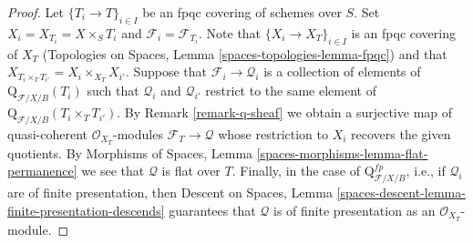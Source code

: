 \documentclass{stacks-project}
\theoremstyle{plain}
\theoremstyle{definition}
\theoremstyle{remark}
\numberwithin{equation}{subsection}
\begin{document}
\begin{proof}
Let $\{T_i \to T\}_{i \in I}$ be an fpqc covering of schemes over $S$.
Set $X_i = X_{T_i} = X \times_S T_i$ and $\mathcal{F}_i = \mathcal{F}_{T_i}$.
Note that $\{X_i \to X_T\}_{i \in I}$ is an fpqc covering of
$X_T$ (Topologies on Spaces, Lemma \ref{spaces-topologies-lemma-fpqc})
and that $X_{T_i \times_T T_{i'}} = X_i \times_{X_T} X_{i'}$.
Suppose that $\mathcal{F}_i \to \mathcal{Q}_i$ is a collection of
elements of $\text{Q}_{\mathcal{F}/X/B}(T_i)$ such that $\mathcal{Q}_i$
and $\mathcal{Q}_{i'}$ restrict to the same element of
$\text{Q}_{\mathcal{F}/X/B}(T_i \times_T T_{i'})$. By
Remark \ref{remark-q-sheaf}
we obtain a surjective map of quasi-coherent $\mathcal{O}_{X_T}$-modules
$\mathcal{F}_T \to \mathcal{Q}$ whose restriction to $X_i$ recovers
the given quotients.
By Morphisms of Spaces, Lemma \ref{spaces-morphisms-lemma-flat-permanence}
we see that $\mathcal{Q}$ is flat over $T$. Finally, in the case of
$\text{Q}^{fp}_{\mathcal{F}/X/B}$, i.e., if $\mathcal{Q}_i$ are
of finite presentation, then
Descent on Spaces, Lemma
\ref{spaces-descent-lemma-finite-presentation-descends}
guarantees that $\mathcal{Q}$ is of finite presentation as an
$\mathcal{O}_{X_T}$-module.
\end{proof}
\end{document}
